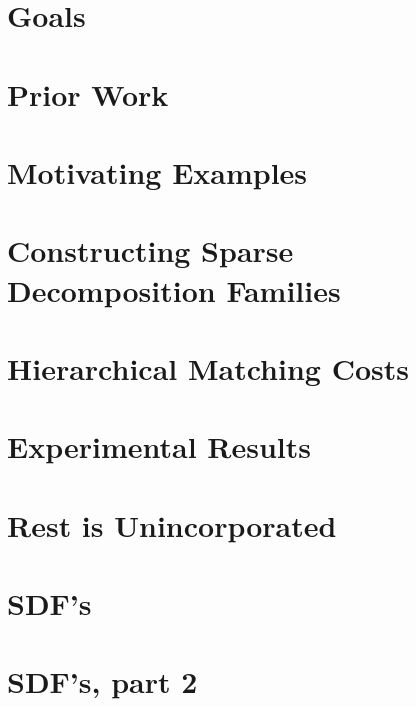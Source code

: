 \documentclass{tufte-book}
\begin{document}
  \section{Goals}
    

  \section{Prior Work}

  \section{Motivating Examples}

  \section{Constructing Sparse Decomposition Families}

  \section{Hierarchical Matching Costs}

  \section{Experimental Results}

  \section{Rest is Unincorporated}

  \section{SDF's}
    

  \section{SDF's, part 2}
    


%     
%     
%     
%    
\end{document}
